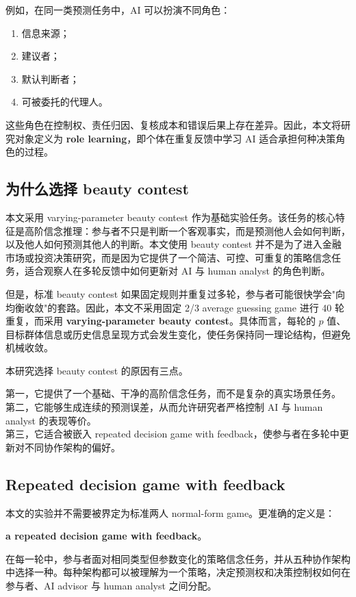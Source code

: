 \documentclass[12pt]{article}
\begin{document}
例如，在同一类预测任务中，AI 可以扮演不同角色：
\begin{enumerate}[label=\arabic*.]
    \item 信息来源；
    \item 建议者；
    \item 默认判断者；
    \item 可被委托的代理人。
\end{enumerate}

这些角色在控制权、责任归因、复核成本和错误后果上存在差异。因此，本文将研究对象定义为 \textbf{role learning}，即个体在重复反馈中学习 AI 适合承担何种决策角色的过程。

\subsection{为什么选择 beauty contest}

本文采用 varying-parameter beauty contest 作为基础实验任务。该任务的核心特征是高阶信念推理：参与者不只是判断一个客观事实，而是预测他人会如何判断，以及他人如何预测其他人的判断。本文使用 beauty contest 并不是为了进入金融市场或投资决策研究，而是因为它提供了一个简洁、可控、可重复的策略信念任务，适合观察人在多轮反馈中如何更新对 AI 与 human analyst 的角色判断。

但是，标准 beauty contest 如果固定规则并重复过多轮，参与者可能很快学会"向均衡收敛"的套路。因此，本文不采用固定 2/3 average guessing game 进行 40 轮重复，而采用 \textbf{varying-parameter beauty contest}。具体而言，每轮的 $p$ 值、目标群体信息或历史信息呈现方式会发生变化，使任务保持同一理论结构，但避免机械收敛。

本研究选择 beauty contest 的原因有三点。

第一，它提供了一个基础、干净的高阶信念任务，而不是复杂的真实场景任务。\\
第二，它能够生成连续的预测误差，从而允许研究者严格控制 AI 与 human analyst 的表现等价。\\
第三，它适合被嵌入 repeated decision game with feedback，使参与者在多轮中更新对不同协作架构的偏好。

\subsection{Repeated decision game with feedback}

本文的实验并不需要被界定为标准两人 normal-form game。更准确的定义是：

\textbf{a repeated decision game with feedback}。

在每一轮中，参与者面对相同类型但参数变化的策略信念任务，并从五种协作架构中选择一种。每种架构都可以被理解为一个策略，决定预测权和决策控制权如何在参与者、AI advisor 与 human analyst 之间分配。
\end{document}
